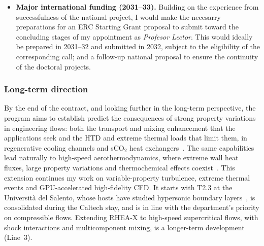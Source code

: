 \documentclass[11pt]{article}
\begin{document}
\begin{itemize}
  \item \textbf{Major international funding (2031--33).} Building on the experience from successfulness of the national project, I would make the necesarry preparations for an ERC Starting Grant proposal to submit toward the concluding stages of my appointment as \textit{Profesor Lector}. This would ideally be prepared in 2031--32 and submitted in 2032, subject to the eligibility of the corresponding call; and a follow-up national proposal to ensure the continuity of the doctoral projects. %
\end{itemize}

\subsubsection{Long-term direction}
By the end of the contract, and looking further in the long-term perspective, the program aims to establish predict the consequences of strong property variations in engineering flows: both the transport and mixing enhancement that the applications seek and the HTD and extreme thermal loads that limit them, in regenerative cooling channels and sCO$_2$ heat exchangers~\cite{Pizzarelli2018,Ahn2015}. 
The same capabilities lead naturally to high-speed aerothermodynamics, where extreme wall heat fluxes, large property variations and thermochemical effects coexist~\cite{Urzay2018,DiRenzoUrzay2021,Passiatore2022}. 
This extension continues my work on variable-property turbulence, extreme thermal events and GPU-accelerated high-fidelity CFD. 
It starts with T2.3 at the Universit\`a del Salento, whose hosts have studied hypersonic boundary layers~\cite{DiRenzoUrzay2021,Passiatore2022}, is consolidated during the Caltech stay, and is in line with the department's priority on compressible flows. 
Extending RHEA-X to high-speed supercritical flows, with shock interactions and multicomponent mixing, is a longer-term development (Line~3).
\end{document}
